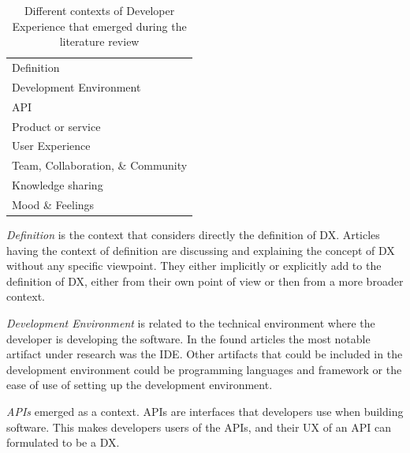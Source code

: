 \documentclass[english, 12pt, a4paper, sci, utf8, a-1b, online]{aaltothesis}
\begin{document}
\begin{table}[ht]
  \begin{center}
    \begin{tabular}{l}
      \hline
      Definition                        \\
      Development Environment           \\
      API                               \\
      Product or service                \\
      User Experience                   \\
      Team, Collaboration, \& Community \\
      Knowledge sharing                 \\
      Mood \& Feelings                  \\
      \hline
    \end{tabular}
    \captionsetup{width=0.6\textwidth}
    \caption{Different contexts of Developer Experience that emerged during the literature review}
    \label{table:contexts}
  \end{center}
\end{table}

\textit{Definition} is the context that considers directly the definition of DX. Articles having the context of definition are discussing and explaining the concept of DX without any specific viewpoint. They either implicitly or explicitly add to the definition of DX, either from their own point of view or then from a more broader context.

\textit{Development Environment} is related to the technical environment where the developer is developing the software. In the found articles the most notable artifact under research was the IDE. Other artifacts that could be included in the development environment could be programming languages and framework or the ease of use of setting up the development environment.

\textit{APIs} emerged as a context. APIs are interfaces that developers use when building software. This makes developers users of the APIs, and their UX of an API can formulated to be a DX.
\end{document}
